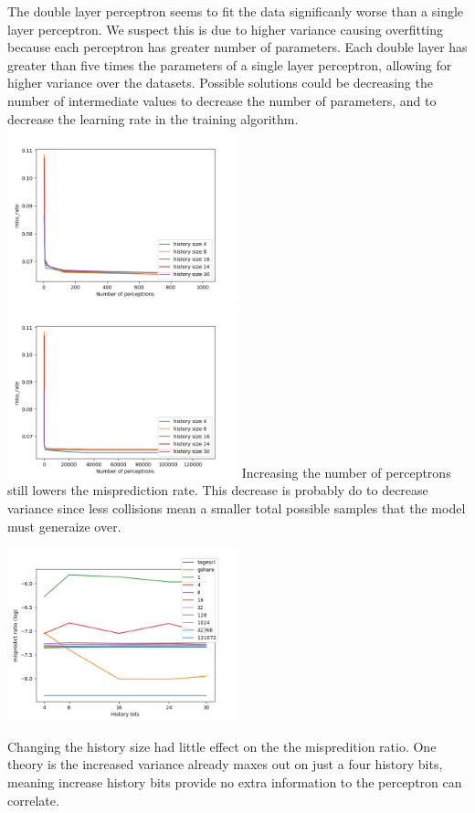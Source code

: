 \documentclass{article}
\begin{document}
The double layer perceptron seems to fit the data significanly worse than a single layer perceptron. We suspect this is due to higher variance causing overfitting because each perceptron has greater number of parameters. Each double layer has greater than five times the parameters of a single layer perceptron, allowing for higher variance over the datasets. Possible solutions could be decreasing the number of intermediate values to decrease the number of parameters, and to decrease the learning rate in the training algorithm.
\includegraphics[width=0.5\textwidth]{./cse220data/data_2_layer/x_num_perceptrons_no_last_2.png}
\includegraphics[width=0.5\textwidth]{./cse220data/data_2_layer/x_num_perceptrons_all.png}
Increasing the number of perceptrons still lowers the misprediction rate. This decrease is probably do to decrease variance since less collisions mean a smaller total possible samples that the model must generaize over.
\begin{center}
  \includegraphics[width=0.5\textwidth]{./cse220data/data_2_layer/x_hist.png}
\end{center}
Changing the history size had little effect on the the mispredition ratio. One theory is the increased variance already maxes out on just a four history bits, meaning increase history bits provide no extra information to the perceptron can correlate.



\end{document}
